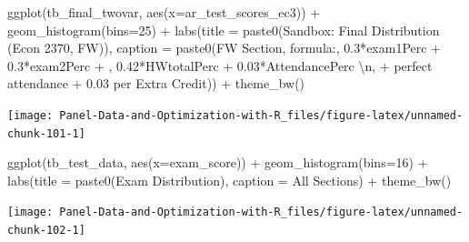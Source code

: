 \documentclass[
]{book}
\newenvironment{Shaded}{\begin{snugshade}}{\end{snugshade}}
\newcommand{\AttributeTok}[1]{\textcolor[rgb]{0.77,0.63,0.00}{#1}}
\newcommand{\DecValTok}[1]{\textcolor[rgb]{0.00,0.00,0.81}{#1}}
\newcommand{\FunctionTok}[1]{\textcolor[rgb]{0.00,0.00,0.00}{#1}}
\newcommand{\NormalTok}[1]{#1}
\newcommand{\SpecialCharTok}[1]{\textcolor[rgb]{0.00,0.00,0.00}{#1}}
\newcommand{\StringTok}[1]{\textcolor[rgb]{0.31,0.60,0.02}{#1}}
\begin{document}
\begin{Shaded}
\begin{Highlighting}[]
\FunctionTok{ggplot}\NormalTok{(tb\_final\_twovar, }\FunctionTok{aes}\NormalTok{(}\AttributeTok{x=}\NormalTok{ar\_test\_scores\_ec3)) }\SpecialCharTok{+}
  \FunctionTok{geom\_histogram}\NormalTok{(}\AttributeTok{bins=}\DecValTok{25}\NormalTok{) }\SpecialCharTok{+}
  \FunctionTok{labs}\NormalTok{(}\AttributeTok{title =} \FunctionTok{paste0}\NormalTok{(}\StringTok{\textquotesingle{}Sandbox: Final Distribution (Econ 2370, FW)\textquotesingle{}}\NormalTok{),}
       \AttributeTok{caption =} \FunctionTok{paste0}\NormalTok{(}\StringTok{\textquotesingle{}FW Section, formula:\textquotesingle{}}\NormalTok{,}
                        \StringTok{\textquotesingle{}0.3*exam1Perc + 0.3*exam2Perc + \textquotesingle{}}\NormalTok{,}
                        \StringTok{\textquotesingle{}0.42*HWtotalPerc + 0.03*AttendancePerc }\SpecialCharTok{\textbackslash{}n}\StringTok{\textquotesingle{}}\NormalTok{,}
                        \StringTok{\textquotesingle{}+ perfect attendance + 0.03 per Extra Credit\textquotesingle{}}\NormalTok{)) }\SpecialCharTok{+}
  \FunctionTok{theme\_bw}\NormalTok{()}
\end{Highlighting}
\end{Shaded}

\begin{center}\texttt{[image: Panel-Data-and-Optimization-with-R\_files/figure-latex/unnamed-chunk-101-1]} \end{center}

\begin{Shaded}
\begin{Highlighting}[]
\FunctionTok{ggplot}\NormalTok{(tb\_test\_data, }\FunctionTok{aes}\NormalTok{(}\AttributeTok{x=}\NormalTok{exam\_score)) }\SpecialCharTok{+}
  \FunctionTok{geom\_histogram}\NormalTok{(}\AttributeTok{bins=}\DecValTok{16}\NormalTok{) }\SpecialCharTok{+}
  \FunctionTok{labs}\NormalTok{(}\AttributeTok{title =} \FunctionTok{paste0}\NormalTok{(}\StringTok{\textquotesingle{}Exam Distribution\textquotesingle{}}\NormalTok{),}
       \AttributeTok{caption =} \StringTok{\textquotesingle{}All Sections\textquotesingle{}}\NormalTok{) }\SpecialCharTok{+}
  \FunctionTok{theme\_bw}\NormalTok{()}
\end{Highlighting}
\end{Shaded}

\begin{center}\texttt{[image: Panel-Data-and-Optimization-with-R\_files/figure-latex/unnamed-chunk-102-1]} \end{center}
\end{document}
